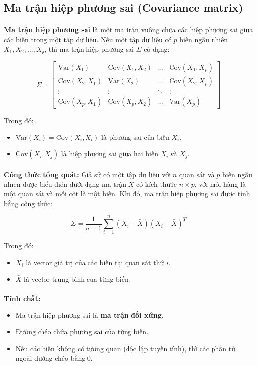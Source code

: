 \subsection{Ma trận hiệp phương sai (Covariance matrix)}

\paragraph{}{\textbf{Ma trận hiệp phương sai} là một ma trận vuông chứa các hiệp phương sai giữa các biến trong một tập dữ liệu. Nếu một tập dữ liệu có \( p \) biến ngẫu nhiên \( X_1, X_2, \dots, X_p \), thì ma trận hiệp phương sai \( \Sigma \) có dạng:}

\[
\Sigma =
\begin{bmatrix}
\text{Var}(X_1) & \text{Cov}(X_1, X_2) & \dots & \text{Cov}(X_1, X_p) \\
\text{Cov}(X_2, X_1) & \text{Var}(X_2) & \dots & \text{Cov}(X_2, X_p) \\
\vdots & \vdots & \ddots & \vdots \\
\text{Cov}(X_p, X_1) & \text{Cov}(X_p, X_2) & \dots & \text{Var}(X_p)
\end{bmatrix}
\]

Trong đó:
\begin{itemize}
\item \( \text{Var}(X_i) = \text{Cov}(X_i, X_i) \) là phương sai của biến \( X_i \).
\item \( \text{Cov}(X_i, X_j) \) là hiệp phương sai giữa hai biến \( X_i \) và \( X_j \).
\end{itemize}
\paragraph{}{\textbf{Công thức tổng quát:}
Giả sử có một tập dữ liệu với \( n \) quan sát và \( p \) biến ngẫu nhiên được biểu diễn dưới dạng ma trận \( X \) có kích thước \( n \times p \), với mỗi hàng là một quan sát và mỗi cột là một biến. Khi đó, ma trận hiệp phương sai được tính bằng công thức:}

\[
\Sigma = \frac{1}{n - 1} \sum_{i=1}^{n} (X_i - \bar{X})(X_i - \bar{X})^T
\]

Trong đó:
\begin{itemize}
\item \( X_i \) là vector giá trị của các biến tại quan sát thứ \( i \).
\item\( \bar{X} \) là vector trung bình của từng biến.
\end{itemize}
\paragraph{}{\textbf{Tính chất:}}
\begin{itemize}
    \item Ma trận hiệp phương sai là \textbf{ma trận đối xứng}.
    \item Đường chéo chứa phương sai của từng biến.
    \item Nếu các biến không có tương quan (độc lập tuyến tính), thì các phần tử ngoài đường chéo bằng 0.
\end{itemize}

\pagebreak
